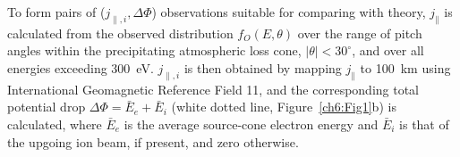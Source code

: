 






  To form pairs of ($j_{\parallel,i}, \Delta \Phi$) observations
  suitable for comparing with theory, $j_\parallel$ is calculated from
  the observed distribution $f_O ( E, \theta )$ over the range of
  pitch angles within the precipitating atmospheric loss cone, $\vert
  \theta \vert < 30^\circ$, and over all energies exceeding 300~eV.
  $j_{\parallel,i}$ is then obtained by mapping $j_\parallel$ to
  100~km using International Geomagnetic Reference Field 11, and the
  corresponding total potential drop $\Delta \Phi = \bar{E}_e +
  \bar{E}_i$ (white dotted line, Figure~\ref{ch6:Fig1}b) is calculated,
  where $\bar{E}_e$ is the average source-cone electron energy and
  $\bar{E}_i$ is that of the upgoing ion beam, if present, and zero
  otherwise.

